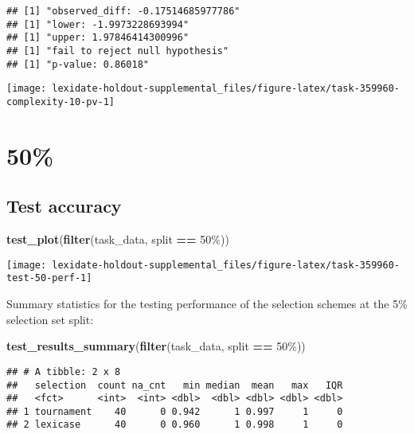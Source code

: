 \documentclass[
]{book}
\newenvironment{Shaded}{\begin{snugshade}}{\end{snugshade}}
\newcommand{\FunctionTok}[1]{\textcolor[rgb]{0.13,0.29,0.53}{\textbf{#1}}}
\newcommand{\NormalTok}[1]{#1}
\newcommand{\SpecialCharTok}[1]{\textcolor[rgb]{0.81,0.36,0.00}{\textbf{#1}}}
\newcommand{\StringTok}[1]{\textcolor[rgb]{0.31,0.60,0.02}{#1}}
\begin{document}
\begin{verbatim}
## [1] "observed_diff: -0.17514685977786"
## [1] "lower: -1.9973228693994"
## [1] "upper: 1.97846414300996"
## [1] "fail to reject null hypothesis"
## [1] "p-value: 0.86018"
\end{verbatim}

\texttt{[image: lexidate-holdout-supplemental\_files/figure-latex/task-359960-complexity-10-pv-1]}

\hypertarget{section-47}{%
\section{50\%}\label{section-47}}

\hypertarget{test-accuracy-47}{%
\subsection{Test accuracy}\label{test-accuracy-47}}

\begin{Shaded}
\begin{Highlighting}[]
\FunctionTok{test\_plot}\NormalTok{(}\FunctionTok{filter}\NormalTok{(task\_data, split }\SpecialCharTok{==} \StringTok{\textquotesingle{}50\%\textquotesingle{}}\NormalTok{))}
\end{Highlighting}
\end{Shaded}

\texttt{[image: lexidate-holdout-supplemental\_files/figure-latex/task-359960-test-50-perf-1]}

Summary statistics for the testing performance of the selection schemes at the 5\% selection set split:

\begin{Shaded}
\begin{Highlighting}[]
\FunctionTok{test\_results\_summary}\NormalTok{(}\FunctionTok{filter}\NormalTok{(task\_data, split }\SpecialCharTok{==} \StringTok{\textquotesingle{}50\%\textquotesingle{}}\NormalTok{))}
\end{Highlighting}
\end{Shaded}

\begin{verbatim}
## # A tibble: 2 x 8
##   selection  count na_cnt   min median  mean   max   IQR
##   <fct>      <int>  <int> <dbl>  <dbl> <dbl> <dbl> <dbl>
## 1 tournament    40      0 0.942      1 0.997     1     0
## 2 lexicase      40      0 0.960      1 0.998     1     0
\end{verbatim}
\end{document}
